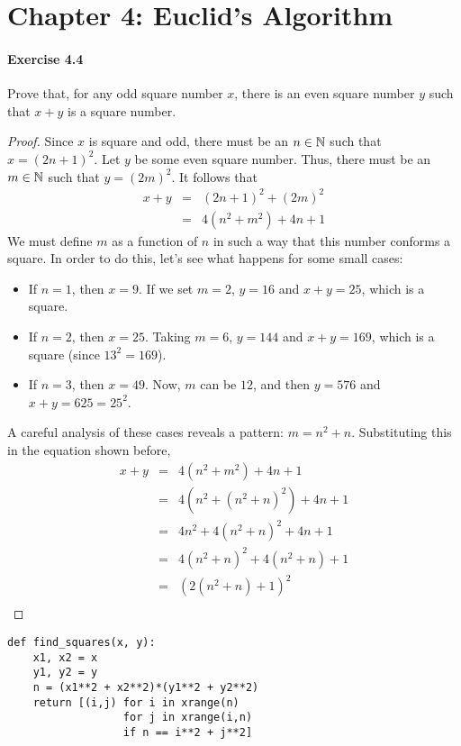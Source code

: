\section*{Chapter 4: Euclid's Algorithm}

\paragraph{Exercise 4.4}
Prove that, for any odd square number $x$, there is an even square number $y$
such that $x+y$ is a square number.

\begin{proof}
Since $x$ is square and odd, there must be an $n \in \mathbb{N}$ such that
$x = (2n+1)^2$. Let $y$ be some even square number. Thus, there must be an
$m \in \mathbb{N}$ such that $y = (2m)^2$. It follows that
\begin{eqnarray*}
x+y &=& (2n+1)^2 + (2m)^2 \\
    &=& 4(n^2 + m^2) + 4n + 1 
\end{eqnarray*}
We must define $m$ as a function of $n$ in such a way that this number conforms
a square. In order to do this, let's see what happens for some small cases:
\begin{itemize}
    \item If $n = 1$, then $x = 9$. If we set $m = 2$, $y = 16$ and $x+y = 25$,
    which is a square.
    \item If $n = 2$, then $x = 25$. Taking $m = 6$, $y = 144$ and $x+y = 169$,
    which is a square (since $13^2 = 169$).
    \item If $n = 3$, then $x = 49$. Now, $m$ can be $12$, and then $y = 576$
    and $x+y = 625 = 25^2$.
\end{itemize}
A careful analysis of these cases reveals a pattern: $m = n^2 + n$. Substituting
this in the equation shown before,
\begin{eqnarray*}
x+y &=& 4(n^2 + m^2) + 4n + 1  \\
    &=& 4(n^2 + (n^2 + n)^2) + 4n + 1 \\
    &=& 4n^2 + 4(n^2 + n)^2 + 4n + 1 \\
    &=& 4(n^2 + n)^2 + 4(n^2 + n) + 1 \\
    &=& (2(n^2 + n) + 1)^2 \\
\end{eqnarray*}
\end{proof}


\newsavebox\sqpython
\begin{lrbox}{\sqpython}
    \begin{minipage}[t]{3in}
         \vspace{4px}
         \begin{verbatim}
def find_squares(x, y):
    x1, x2 = x
    y1, y2 = y
    n = (x1**2 + x2**2)*(y1**2 + y2**2)
    return [(i,j) for i in xrange(n)
                  for j in xrange(i,n)
                  if n == i**2 + j**2]
         \end{verbatim}
    \end{minipage}
\end{lrbox}

